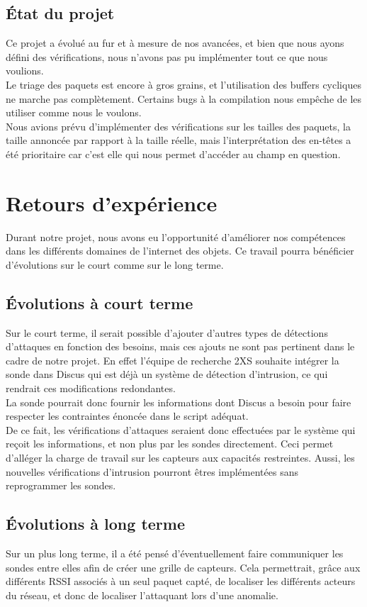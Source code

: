 	\subsection{État du projet}
		Ce projet a évolué au fur et à mesure de nos avancées, et bien que nous ayons défini des vérifications, nous n'avons pas pu implémenter tout ce que nous voulions.\\
		Le triage des paquets est encore à gros grains, et l'utilisation des buffers cycliques ne marche pas complètement. Certains bugs à la compilation nous empêche de les utiliser comme nous le voulons.\\
		Nous avions prévu d'implémenter des vérifications sur les tailles des paquets, la taille annoncée par rapport à la taille réelle, mais l'interprétation des en-têtes a été prioritaire car c'est elle qui nous permet d'accéder au champ en question.

\section{Retours d'expérience} %
    Durant notre projet, nous avons eu l'opportunité d'améliorer nos compétences dans les différents domaines de l'internet des objets. Ce travail pourra bénéficier d'évolutions sur le court comme sur le long terme.
    
	\subsection{Évolutions à court terme} %
	Sur le court terme, il serait possible d'ajouter d'autres types de détections d'attaques en fonction des besoins, mais ces ajouts ne sont pas pertinent dans le cadre de notre projet. En effet l'équipe de recherche 2XS souhaite intégrer la sonde dans Discus qui est déjà un système de détection d'intrusion, ce qui rendrait ces modifications redondantes.\\
	La sonde pourrait donc fournir les informations dont Discus a besoin pour faire respecter les contraintes énoncée dans le script adéquat.\\ 
	De ce fait, les vérifications d'attaques seraient donc effectuées par le système qui reçoit les informations, et non plus par les sondes directement. Ceci permet d'alléger la charge de travail sur les capteurs aux capacités restreintes. Aussi, les nouvelles vérifications d'intrusion pourront êtres implémentées sans reprogrammer les sondes.
	\subsection{Évolutions à long terme} %
	Sur un plus long terme, il a été pensé d'éventuellement faire communiquer les sondes entre elles afin de créer une grille de capteurs.
	Cela permettrait, grâce aux différents RSSI associés à un seul paquet capté, de localiser les différents acteurs du réseau, et donc de localiser l'attaquant lors d'une anomalie.
